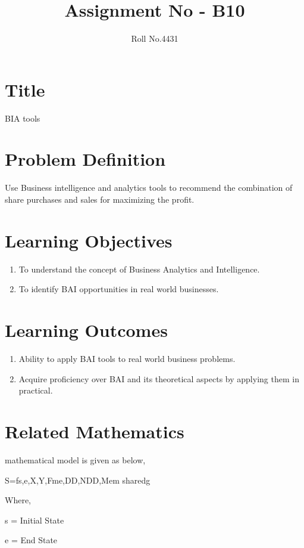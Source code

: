 \documentclass[a4paper]{article}
\title{
	\normalfont \normalsize 
	\huge Assignment No - B10 \\
}
\author{Roll No.4431}
\date{\normalsize}
\begin{document}
	\maketitle

\section{Title}   
BIA tools 

\section{Problem Definition}   
Use Business intelligence and analytics tools to recommend the combination of share purchases and sales for maximizing the profit.

\section{Learning Objectives}
\begin{enumerate}
\item To understand the concept of Business Analytics and Intelligence.
\item To identify BAI opportunities in real world businesses.
\end{enumerate}

\section{Learning Outcomes}
\begin{enumerate}
\item Ability to apply BAI tools to real world business problems.
\item Acquire proficiency over BAI and its theoretical aspects by applying them in practical.
\end{enumerate}

\section{Related Mathematics}

{\rmfamily
	mathematical model is given as below,}


\bigskip

\textrm{S=fs,e,X,Y,Fme,DD,NDD,Mem sharedg}


\bigskip

{\rmfamily
	Where,}

{\rmfamily
	s = Initial State}

{\rmfamily
	e = End State}
\end{document}
